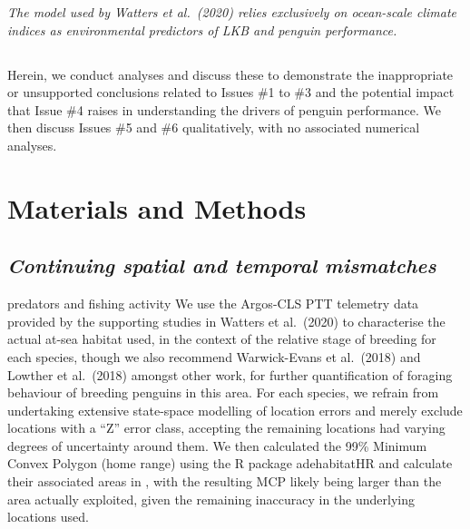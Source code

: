 \documentclass[]{elsarticle} %
\begin{document}
\emph{The model used by Watters et al.~(2020) relies exclusively on
ocean-scale climate indices as environmental predictors of LKB and
penguin performance.}

\subsection{}\label{section}

Herein, we conduct analyses and discuss these to demonstrate the
inappropriate or unsupported conclusions related to Issues \#1 to \#3
and the potential impact that Issue \#4 raises in understanding the
drivers of penguin performance. We then discuss Issues \#5 and \#6
qualitatively, with no associated numerical analyses.

\section{Materials and Methods}\label{materials-and-methods}

\subsection{\texorpdfstring{\emph{Continuing spatial and temporal
mismatches}}{Continuing spatial and temporal mismatches}}\label{continuing-spatial-and-temporal-mismatches}

predators and fishing activity We use the Argos-CLS PTT telemetry data
provided by the supporting studies in Watters et al.~(2020) to
characterise the actual at-sea habitat used, in the context of the
relative stage of breeding for each species, though we also recommend
Warwick-Evans et al.~(2018) and Lowther et al.~(2018) amongst other
work, for further quantification of foraging behaviour of breeding
penguins in this area. For each species, we refrain from undertaking
extensive state-space modelling of location errors and merely exclude
locations with a ``Z'' error class, accepting the remaining locations
had varying degrees of uncertainty around them. We then calculated the
99\% Minimum Convex Polygon (home range) using the R package
adehabitatHR and calculate their associated areas in , with the
resulting MCP likely being larger than the area actually exploited,
given the remaining inaccuracy in the underlying locations used.
\end{document}
